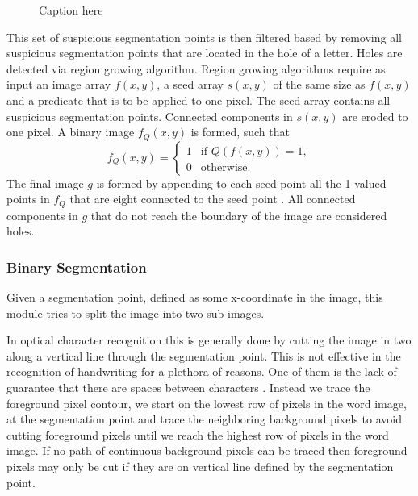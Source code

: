 	\begin{figure}
		\centering
		\caption{Caption here}
		\label{fig:method:segmentation:suspiciousSegmentationPoints}
	\end{figure}

	This set of suspicious segmentation points is then filtered based by removing all suspicious segmentation points that are located in the hole of a letter. Holes are detected via region growing algorithm. Region growing algorithms require as input an image array $f(x,y)$, a seed array $s(x,y)$ of the same size as $f(x,y)$ and a predicate that is to be applied to one pixel. The seed array contains all suspicious segmentation points. Connected components in $s(x,y)$ are eroded to one pixel. A binary image $f_Q(x,y)$ is formed, such that
	\begin{equation*}
		f_Q(x,y) = 
		\begin{cases}
			1 & \text{if }Q(f(x,y)) = 1,\\
			0 & \text{otherwise.}
		\end{cases}
	\end{equation*}
	The final image $g$ is formed by appending to each seed point all the 1-valued points in $f_Q$ that are eight connected to the seed point \cite{gonzalez2002digitalCh10}. All connected components in $g$ that do not reach the boundary of the image are considered holes. 

\subsubsection{Binary Segmentation}
	\label{sss:method:segmentation:binarySegmentation}
	Given a segmentation point, defined as some x-coordinate in the image, this module tries to split the image into two sub-images. 

	In optical character recognition this is generally done by cutting the image in two along a vertical line through the segmentation point. This is not effective in the recognition of handwriting for a plethora of reasons. One of them is the lack of guarantee that there are spaces between characters \cite{lee2012binary}. Instead we trace the foreground pixel contour, we start on the lowest row of pixels in the word image, at the segmentation point and trace the neighboring background pixels to avoid cutting foreground pixels until we reach the highest row of pixels in the word image. If no path of continuous background pixels can be traced then foreground pixels may only be cut if they are on vertical line defined by the segmentation point. 

